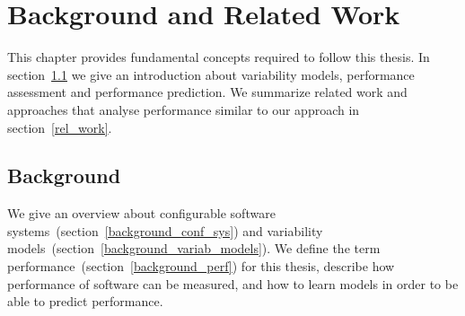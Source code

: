 \chapter{Background and Related Work}
\label{b_rel_work}

This chapter provides fundamental concepts required to follow this thesis. 
In section~\ref{background} we give an introduction about variability models, performance assessment and performance prediction. 
We summarize related work and approaches that analyse performance similar to our approach in section~\ref{rel_work}.

\section{Background}
\label{background}

We give an overview about configurable software systems~(section~\ref{background_conf_sys}) and variability models~(section~\ref{background_variab_models}). 
We define the term performance~(section~\ref{background_perf}) for this thesis, describe how performance of software can be measured, and how to learn models in order to be able to predict performance.

